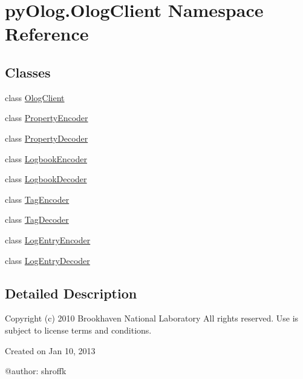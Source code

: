 \hypertarget{namespacepyOlog_1_1OlogClient}{\section{py\-Olog.\-Olog\-Client Namespace Reference}
\label{namespacepyOlog_1_1OlogClient}
}
\subsection*{Classes}
\begin{DoxyCompactItemize}
\item 
class \hyperlink{classpyOlog_1_1OlogClient_1_1OlogClient}{Olog\-Client}
\item 
class \hyperlink{classpyOlog_1_1OlogClient_1_1PropertyEncoder}{Property\-Encoder}
\item 
class \hyperlink{classpyOlog_1_1OlogClient_1_1PropertyDecoder}{Property\-Decoder}
\item 
class \hyperlink{classpyOlog_1_1OlogClient_1_1LogbookEncoder}{Logbook\-Encoder}
\item 
class \hyperlink{classpyOlog_1_1OlogClient_1_1LogbookDecoder}{Logbook\-Decoder}
\item 
class \hyperlink{classpyOlog_1_1OlogClient_1_1TagEncoder}{Tag\-Encoder}
\item 
class \hyperlink{classpyOlog_1_1OlogClient_1_1TagDecoder}{Tag\-Decoder}
\item 
class \hyperlink{classpyOlog_1_1OlogClient_1_1LogEntryEncoder}{Log\-Entry\-Encoder}
\item 
class \hyperlink{classpyOlog_1_1OlogClient_1_1LogEntryDecoder}{Log\-Entry\-Decoder}
\end{DoxyCompactItemize}


\subsection{Detailed Description}
\begin{DoxyVerb}Copyright (c) 2010 Brookhaven National Laboratory
All rights reserved. Use is subject to license terms and conditions.

Created on Jan 10, 2013

@author: shroffk
\end{DoxyVerb}
 